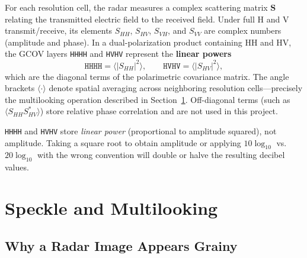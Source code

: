 \documentclass[11pt,a4paper]{article}
\begin{document}
For each resolution cell, the radar measures a complex scattering matrix $\mathbf S$ relating the transmitted electric field to the
received field. Under full H and V transmit/receive, its elements $S_{HH}$, $S_{HV}$, $S_{VH}$, and $S_{VV}$ are
complex numbers (amplitude and phase). In a dual-polarization product containing HH and HV, the GCOV layers \texttt{HHHH} and
\texttt{HVHV} represent the \textbf{linear powers}
\begin{equation}
  \texttt{HHHH} = \langle |S_{HH}|^2 \rangle,
  \qquad
  \texttt{HVHV} = \langle |S_{HV}|^2 \rangle,
  \label{eq:cov-diag}
\end{equation}
which are the diagonal terms of the polarimetric covariance matrix. The angle brackets $\langle\cdot\rangle$
denote spatial averaging across neighboring resolution cells---precisely the multilooking operation described in
Section~\ref{sec:speckle}. Off-diagonal terms (such as $\langle S_{HH}S_{HV}^*\rangle$) store relative phase correlation and are not used in this project.

\begin{cuidado}
\texttt{HHHH} and \texttt{HVHV} store \emph{linear power} (proportional to amplitude squared), not amplitude.
Taking a square root to obtain amplitude or applying $10\log_{10}$ vs.\ $20\log_{10}$ with the wrong convention
will double or halve the resulting decibel values.
\end{cuidado}

\section{Speckle and Multilooking}
\label{sec:speckle}

\subsection{Why a Radar Image Appears Grainy}
\end{document}
